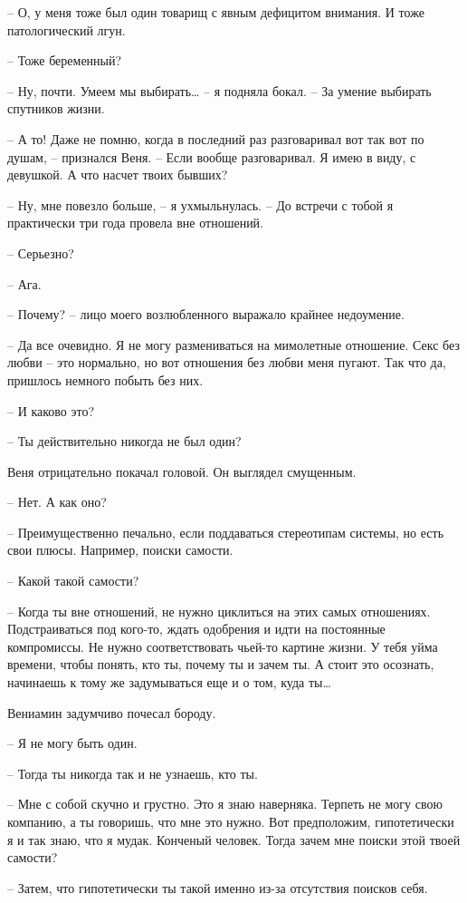 \documentclass[
]{book}
\begin{document}
-- О, у меня тоже был один товарищ с явным дефицитом внимания. И тоже патологический лгун.

-- Тоже беременный?

-- Ну, почти. Умеем мы выбирать\ldots{} -- я подняла бокал. -- За умение выбирать спутников жизни.

-- А то! Даже не помню, когда в последний раз разговаривал вот так вот по душам, -- признался Веня. -- Если вообще разговаривал. Я имею в виду, с девушкой. А что насчет твоих бывших?

-- Ну, мне повезло больше, -- я ухмыльнулась. -- До встречи с тобой я практически три года провела вне отношений.

-- Серьезно?

-- Ага.

-- Почему? -- лицо моего возлюбленного выражало крайнее недоумение.

-- Да все очевидно. Я не могу размениваться на мимолетные отношение. Секс без любви -- это нормально, но вот отношения без любви меня пугают. Так что да, пришлось немного побыть без них.

-- И каково это?

-- Ты действительно никогда не был один?

Веня отрицательно покачал головой. Он выглядел смущенным.

-- Нет. А как оно?

-- Преимущественно печально, если поддаваться стереотипам системы, но есть свои плюсы. Например, поиски самости.

-- Какой такой самости?

-- Когда ты вне отношений, не нужно циклиться на этих самых отношениях. Подстраиваться под кого-то, ждать одобрения и идти на постоянные компромиссы. Не нужно соответствовать чьей-то картине жизни. У тебя уйма времени, чтобы понять, кто ты, почему ты и зачем ты. А стоит это осознать, начинаешь к тому же задумываться еще и о том, куда ты\ldots{}

Вениамин задумчиво почесал бороду.

-- Я не могу быть один.

-- Тогда ты никогда так и не узнаешь, кто ты.

-- Мне с собой скучно и грустно. Это я знаю наверняка. Терпеть не могу свою компанию, а ты говоришь, что мне это нужно. Вот предположим, гипотетически я и так знаю, что я мудак. Конченый человек. Тогда зачем мне поиски этой твоей самости?

-- Затем, что гипотетически ты такой именно из-за отсутствия поисков себя.
\end{document}
